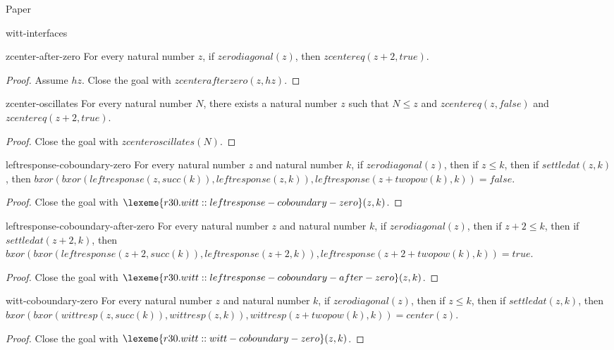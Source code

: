 \begin{lexlean}{Paper}
\begin{section}{witt-interfaces}
  \begin{theorem}{zcenter-after-zero}
  For every natural number \(z\), if \(zerodiagonal(z)\), then \(zcentereq(z + 2, true)\).
  \begin{proof}
  Assume \(hz\).
  Close the goal with \(zcenterafterzero(z, hz)\).
  \end{proof}
  \end{theorem}

  \begin{theorem}{zcenter-oscillates}
  For every natural number \(N\), there exists a natural number \(z\) such that \(N ≤ z\) and \(zcentereq(z, false)\) and \(zcentereq(z + 2, true)\).
  \begin{proof}
  Close the goal with \(zcenteroscillates(N)\).
  \end{proof}
  \end{theorem}

  \begin{theorem}{leftresponse-coboundary-zero}
  For every natural number \(z\) and natural number \(k\), if \(zerodiagonal(z)\), then if \(z ≤ k\), then if \(settledat(z, k)\), then \(bxor(bxor(leftresponse(z, succ(k)), leftresponse(z, k)), leftresponse(z + twopow(k), k)) = false\).
  \begin{proof}
  Close the goal with \(\lexeme{r30.witt::leftresponse-coboundary-zero}(z, k)\).
  \end{proof}
  \end{theorem}

  \begin{theorem}{leftresponse-coboundary-after-zero}
  For every natural number \(z\) and natural number \(k\), if \(zerodiagonal(z)\), then if \(z + 2 ≤ k\), then if \(settledat(z + 2, k)\), then \(bxor(bxor(leftresponse(z + 2, succ(k)), leftresponse(z + 2, k)), leftresponse(z + 2 + twopow(k), k)) = true\).
  \begin{proof}
  Close the goal with \(\lexeme{r30.witt::leftresponse-coboundary-after-zero}(z, k)\).
  \end{proof}
  \end{theorem}

  \begin{theorem}{witt-coboundary-zero}
  For every natural number \(z\) and natural number \(k\), if \(zerodiagonal(z)\), then if \(z ≤ k\), then if \(settledat(z, k)\), then \(bxor(bxor(wittresp(z, succ(k)), wittresp(z, k)), wittresp(z + twopow(k), k)) = center(z)\).
  \begin{proof}
  Close the goal with \(\lexeme{r30.witt::witt-coboundary-zero}(z, k)\).
  \end{proof}
  \end{theorem}


\end{section}
\end{lexlean}
